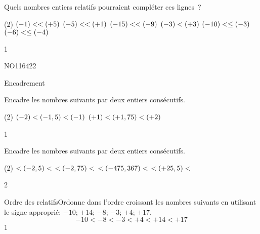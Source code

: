 \documentclass[a4paper,11pt]{report}
\begin{document}
\begin{exop}
{Quels nombres entiers relatifs pourraient compléter ces lignes~?
	\begin{tasks}[after-item-skip=0.3em](2)		
\task $(-1)< \dotfill \medskip <(+5)$\hspace{0.3cm}
\task $(-5)<\dotfill \medskip <(+1)$    \hspace{0.3cm}
\task $(-15)<\dotfill \medskip <(-9)$\hspace{0.3cm}
\task $(-3)\dotfill \medskip <(+3)$\hspace{0.3cm}
\task $(-10) < \dotfill \medskip \leq(-3)$\hspace{0.3cm}
\task $(-6) < \dotfill \medskip \leq(-4)$\hspace{0.3cm}
	\end{tasks}
}{1}
\end{exop}

\begin{exof}{NO116}{42}{2}
\end{exof}


\begin{resolu}{Encadrement}{Encadre les nombres suivants par deux entiers consécutifs.
		\begin{tasks}[before-skip=-0.5em,after-skip=-0.5em](2)
			\task $(-2) \medskip <(-1,5)< \medskip (-1)$
\task $(+1) \medskip <(+1,75)< \medskip (+2)$
		\end{tasks}
}
{1}
\end{resolu}

\begin{exop}
{Encadre les nombres suivants par deux entiers consécutifs.
	\begin{tasks}[after-item-skip=0.2em,after-skip=-0.5em](2)		
		\task $\dotfill \medskip <(-2,5)< \medskip \dotfill$ \hspace{0.2cm}
\task $\dotfill \medskip <(-2,75)< \medskip \dotfill$\hspace{0.2cm}
\task $\dotfill \medskip <(-475,367)< \medskip \dotfill$\hspace{0.2cm}
\task $\dotfill \medskip <(+25,5)< \medskip \dotfill$\hspace{0.2cm}
	\end{tasks}
}
{2}
\end{exop}


\begin{resolu}{Ordre des relatifs}{Ordonne dans l'ordre croissant les nombres suivants en utilisant le signe approprié: $-10$; $+14$; $-8$; $-3$; $+4$; $+17$.
\[-10<-8<-3<+4<+14<+17\]
\vspace{-1cm}}
{1}
\end{resolu}
\end{document}
